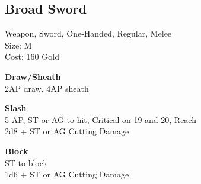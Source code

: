 \subsection{Broad Sword}\label{weapon:broadSword}
Weapon, Sword, One-Handed, Regular, Melee\\
Size: M\\
Cost: 160 Gold

\textbf{Draw/Sheath}\\
2AP draw, 4AP sheath

\textbf{Slash}\\
5 AP, ST or AG to hit, Critical on 19 and 20,  Reach\\
2d8 + \texttimes ST or AG Cutting Damage

\textbf{Block}\\
ST to block\\
1d6 + \texttimes ST or AG Cutting Damage


